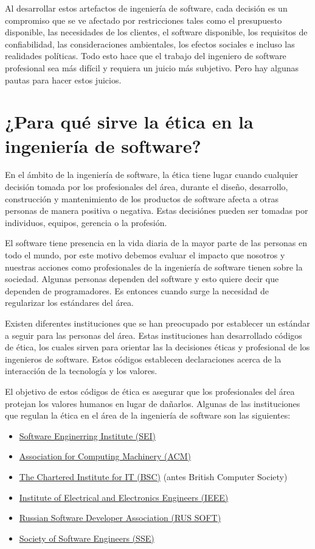\documentclass[twoside]{article}
\begin{document}
\begin{multicols}{2}
Al desarrollar estos artefactos de ingeniería de software, cada decisión es un
compromiso que se ve afectado por restricciones tales como el presupuesto
disponible, las necesidades de los clientes, el software disponible, los
requisitos de confiabilidad, las consideraciones ambientales, los efectos
sociales e incluso las realidades políticas. Todo esto hace que el trabajo del
ingeniero de software profesional sea más difícil y requiera un juicio más
subjetivo. Pero hay algunas pautas para hacer estos juicios.

\section{¿Para qué sirve la ética en la ingeniería de software?}

En el ámbito de la ingeniería de software, la ética tiene lugar cuando cualquier
decisión tomada por los profesionales del área, durante el diseño, desarrollo,
construcción y mantenimiento de los productos de software afecta a otras
personas de manera positiva o negativa. Estas decisiónes pueden ser tomadas por
individuos, equipos, gerencia o la profesión.

El software tiene presencia en la vida diaria de la mayor parte de las personas
en todo el mundo, por este motivo debemos evaluar el impacto que nosotros y
nuestras acciones como profesionales de la ingeniería de software tienen sobre
la sociedad. Algunas personas dependen del software y esto quiere decir que
dependen de programadores. Es entonces cuando surge la necesidad de regularizar
los estándares del área.

Existen diferentes instituciones que se han preocupado por establecer un
estándar a seguir para las personas del área. Estas instituciones han
desarrollado códigos de ética, los cuales sirven para orientar las la decisiones
éticas y profesional de los ingenieros de software. Estos códigos establecen
declaraciones acerca de la interacción de la tecnología y los valores.

El objetivo de estos códigos de ética es asegurar que los profesionales del área
protejan los valores humanos en lugar de dañarlos. Algunas de las instituciones
que regulan la ética en el área de la ingeniería de software son las siguientes:

\begin{itemize}
    \item \href{https://www.sei.cmu.edu/}{Software Enginerring Institute (SEI)}
    \item \href{https://www.acm.org/}{Association for Computing Machinery (ACM)}
\item \href{https://www.bcs.org/}{The Chartered Institute for IT (BSC)} (antes
British Computer Society)
\item \href{https://www.ieee.org/}{Institute of Electrical and Electronics
Engineers (IEEE)} \cite{rogerson2002software}
    \item \href{https://russoft.org/}{Russian Software Developer Association (RUS SOFT)}
    \item \href{https://sse.rit.edu/}{Society of Software Engineers (SSE)}
\end{itemize}


\end{multicols}
\end{document}
